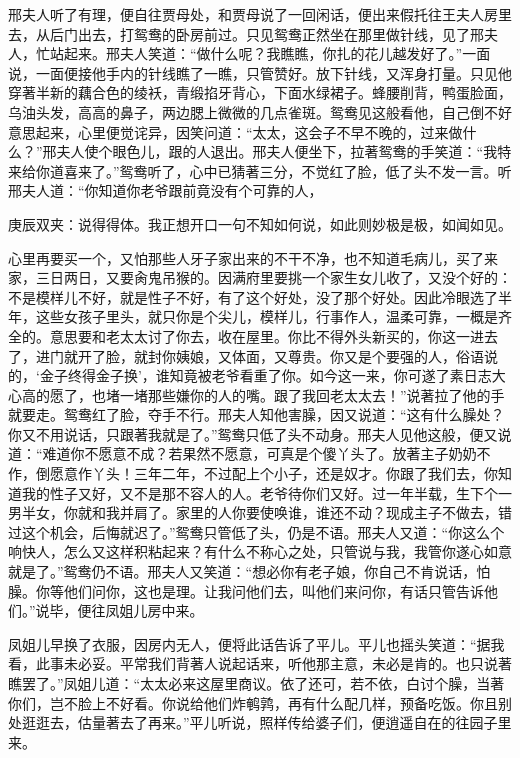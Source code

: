 \begin{parag}
    邢夫人听了有理，便自往贾母处，和贾母说了一回闲话，便出来假托往王夫人房里去，从后门出去，打鸳鸯的卧房前过。只见鸳鸯正然坐在那里做针线，见了邢夫人，忙站起来。邢夫人笑道：“做什么呢？我瞧瞧，你扎的花儿越发好了。”一面说，一面便接他手内的针线瞧了一瞧，只管赞好。放下针线，又浑身打量。只见他穿著半新的藕合色的绫袄，青缎掐牙背心，下面水绿裙子。蜂腰削背，鸭蛋脸面，乌油头发，高高的鼻子，两边腮上微微的几点雀斑。鸳鸯见这般看他，自己倒不好意思起来，心里便觉诧异，因笑问道：“太太，这会子不早不晚的，过来做什么？”邢夫人使个眼色儿，跟的人退出。邢夫人便坐下，拉著鸳鸯的手笑道：“我特来给你道喜来了。”鸳鸯听了，心中已猜著三分，不觉红了脸，低了头不发一言。听邢夫人道：“你知道你老爷跟前竟没有个可靠的人，\begin{note}庚辰双夹：说得得体。我正想开口一句不知如何说，如此则妙极是极，如闻如见。\end{note}心里再要买一个，又怕那些人牙子家出来的不干不净，也不知道毛病儿，买了来家，三日两日，又要肏鬼吊猴的。因满府里要挑一个家生女儿收了，又没个好的：不是模样儿不好，就是性子不好，有了这个好处，没了那个好处。因此冷眼选了半年，这些女孩子里头，就只你是个尖儿，模样儿，行事作人，温柔可靠，一概是齐全的。意思要和老太太讨了你去，收在屋里。你比不得外头新买的，你这一进去了，进门就开了脸，就封你姨娘，又体面，又尊贵。你又是个要强的人，俗语说的，‘金子终得金子换’，谁知竟被老爷看重了你。如今这一来，你可遂了素日志大心高的愿了，也堵一堵那些嫌你的人的嘴。跟了我回老太太去！”说著拉了他的手就要走。鸳鸯红了脸，夺手不行。邢夫人知他害臊，因又说道：“这有什么臊处？你又不用说话，只跟著我就是了。”鸳鸯只低了头不动身。邢夫人见他这般，便又说道：“难道你不愿意不成？若果然不愿意，可真是个傻丫头了。放著主子奶奶不作，倒愿意作丫头！三年二年，不过配上个小子，还是奴才。你跟了我们去，你知道我的性子又好，又不是那不容人的人。老爷待你们又好。过一年半载，生下个一男半女，你就和我并肩了。家里的人你要使唤谁，谁还不动？现成主子不做去，错过这个机会，后悔就迟了。”鸳鸯只管低了头，仍是不语。邢夫人又道：“你这么个响快人，怎么又这样积粘起来？有什么不称心之处，只管说与我，我管你遂心如意就是了。”鸳鸯仍不语。邢夫人又笑道：“想必你有老子娘，你自己不肯说话，怕臊。你等他们问你，这也是理。让我问他们去，叫他们来问你，有话只管告诉他们。”说毕，便往凤姐儿房中来。
\end{parag}


\begin{parag}
    凤姐儿早换了衣服，因房内无人，便将此话告诉了平儿。平儿也摇头笑道：“据我看，此事未必妥。平常我们背著人说起话来，听他那主意，未必是肯的。也只说著瞧罢了。”凤姐儿道：“太太必来这屋里商议。依了还可，若不依，白讨个臊，当著你们，岂不脸上不好看。你说给他们炸鹌鹑，再有什么配几样，预备吃饭。你且别处逛逛去，估量著去了再来。”平儿听说，照样传给婆子们，便逍遥自在的往园子里来。
\end{parag}


